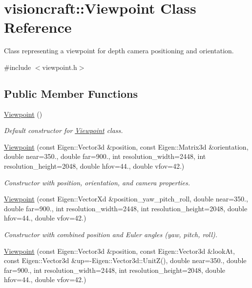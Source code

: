 \hypertarget{classvisioncraft_1_1Viewpoint}{}\section{visioncraft\+:\+:Viewpoint Class Reference}
\label{classvisioncraft_1_1Viewpoint}


Class representing a viewpoint for depth camera positioning and orientation.  




{\ttfamily \#include $<$viewpoint.\+h$>$}

\subsection*{Public Member Functions}
\begin{DoxyCompactItemize}
\item 
\hyperlink{classvisioncraft_1_1Viewpoint_a87bab63b8b2bd6123742307bb47d3392}{Viewpoint} ()
\begin{DoxyCompactList}\small\item\em Default constructor for \hyperlink{classvisioncraft_1_1Viewpoint}{Viewpoint} class. \end{DoxyCompactList}\item 
\hyperlink{classvisioncraft_1_1Viewpoint_a801252e99e7abe9ec2fa90e0f453c864}{Viewpoint} (const Eigen\+::\+Vector3d \&position, const Eigen\+::\+Matrix3d \&orientation, double near=350., double far=900., int resolution\+\_\+width=2448, int resolution\+\_\+height=2048, double hfov=44., double vfov=42.)
\begin{DoxyCompactList}\small\item\em Constructor with position, orientation, and camera properties. \end{DoxyCompactList}\item 
\hyperlink{classvisioncraft_1_1Viewpoint_a4446a40e983904390c0460c5ae9888c3}{Viewpoint} (const Eigen\+::\+Vector\+Xd \&position\+\_\+yaw\+\_\+pitch\+\_\+roll, double near=350., double far=900., int resolution\+\_\+width=2448, int resolution\+\_\+height=2048, double hfov=44., double vfov=42.)
\begin{DoxyCompactList}\small\item\em Constructor with combined position and Euler angles (yaw, pitch, roll). \end{DoxyCompactList}\item 
\hyperlink{classvisioncraft_1_1Viewpoint_a13b3b0cb252b66b1790e8197c3c7f652}{Viewpoint} (const Eigen\+::\+Vector3d \&position, const Eigen\+::\+Vector3d \&look\+At, const Eigen\+::\+Vector3d \&up=-\/Eigen\+::\+Vector3d\+::\+UnitZ(), double near=350., double far=900., int resolution\+\_\+width=2448, int resolution\+\_\+height=2048, double hfov=44., double vfov=42.)

\end{DoxyCompactItemize}

